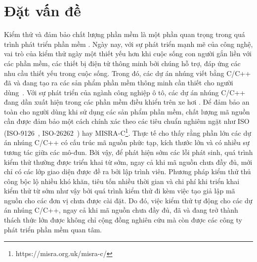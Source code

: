 \chapter*{Đặt vấn đề}\label{chap1}
Kiểm thử và đảm bảo chất lượng phần mềm là một phần quan trọng trong quá trình phát triển phần mềm \cite{GiaoTrinhKiemThu}. Ngày nay, với sự phát triển mạnh mẽ của công nghệ, vai trò của kiểm thử ngày một thiết yếu hơn khi cuộc sống con người gắn liền với các phần mềm, các thiết bị điện tử thông minh bởi chúng hỗ trợ, đáp ứng các nhu cầu thiết yếu trong cuộc sống. Trong đó, các dự án nhúng viết bằng C/C++ đã và đang tạo ra các sản phẩm phần mềm thông minh cần thiết cho người dùng~\cite{plauger1997embedded}. Với sự phát triển của ngành công nghiệp ô tô, các dự án nhúng C/C++ đang dần xuất hiện trong các phần mềm điều khiển trên xe hơi \cite{ehman2017power}. Để đảm bảo an toàn cho người dùng khi sử dụng các sản phẩm phần mềm, chất lượng mã nguồn cần được đảm bảo một cách chính xác theo các tiêu chuẩn nghiêm ngặt như ISO (ISO-9126~\cite{ali2017iso}, ISO-26262~\cite{Hillenbrand2012_1000025616}) hay MISRA-C\footnote{https://misra.org.uk/misra-c/}. Thực tế cho thấy rằng phần lớn các dự án nhúng C/C++ có cấu trúc mã nguồn phức tạp, kích thước lớn và có nhiều sự tương tác giữa các mô-đun. Bởi vậy, để phát hiện sớm các lỗi phát sinh, quá trình kiểm thử thường được triển khai từ sớm, ngay cả khi mã nguồn chưa đầy đủ, mới chỉ có các lớp giao diện được đề ra bởi lập trình viên. Phương pháp kiểm thử thủ công bộc lộ nhiều khó khăn, tiêu tốn nhiều thời gian và chi phí khi triển khai kiểm thử từ sớm như vậy bởi quá trình kiểm thử đi kèm việc tạo giả lập mã nguồn cho các đơn vị chưa được cài đặt. Do đó, việc kiểm thử tự động cho các dự án nhúng C/C++, ngay cả khi mã nguồn chưa đầy đủ, đã và đang trở thành thách thức lớn được không chỉ cộng đồng nghiên cứu mà còn được các công ty phát triển phần mềm quan tâm.

